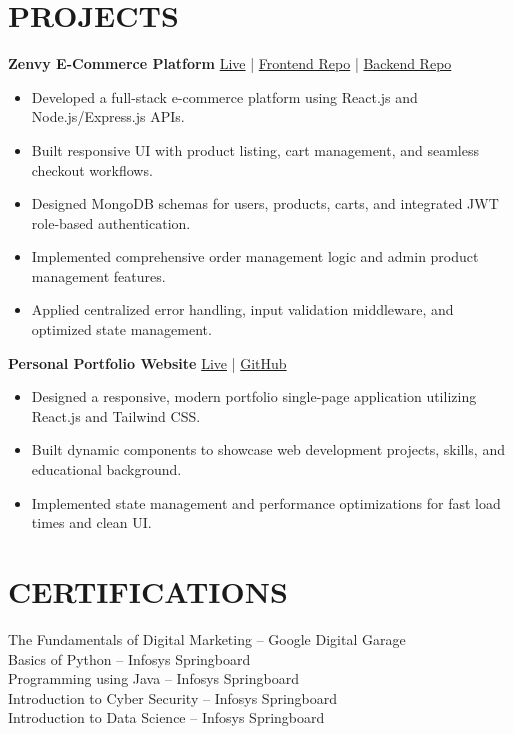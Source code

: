 \documentclass[a4paper,10.5pt]{article}
\begin{document}
\section*{PROJECTS}

\textbf{Zenvy E-Commerce Platform} \hfill
\href{https://zenvy.biz}{Live} \quad | \quad
\href{https://github.com/himanshu344182/zenvy-frontend}{Frontend Repo} \quad | \quad
\href{https://github.com/himanshu344182/zenvy-backend}{Backend Repo}

\begin{itemize}
\item Developed a full-stack e-commerce platform using React.js and Node.js/Express.js APIs.
\item Built responsive UI with product listing, cart management, and seamless checkout workflows.
\item Designed MongoDB schemas for users, products, carts, and integrated JWT role-based authentication.
\item Implemented comprehensive order management logic and admin product management features.
\item Applied centralized error handling, input validation middleware, and optimized state management.
\end{itemize}

\textbf{Personal Portfolio Website} \hfill
\href{https://my-portfolio-five-steel-31.vercel.app/}{Live} \quad | \quad
\href{https://github.com/himanshu344182/my-portfolio}{GitHub}

\begin{itemize}
\item Designed a responsive, modern portfolio single-page application utilizing React.js and Tailwind CSS.
\item Built dynamic components to showcase web development projects, skills, and educational background.
\item Implemented state management and performance optimizations for fast load times and clean UI.
\end{itemize}

\section*{CERTIFICATIONS}

The Fundamentals of Digital Marketing -- Google Digital Garage \\
Basics of Python -- Infosys Springboard \\
Programming using Java -- Infosys Springboard \\
Introduction to Cyber Security -- Infosys Springboard \\
Introduction to Data Science -- Infosys Springboard
\end{document}
